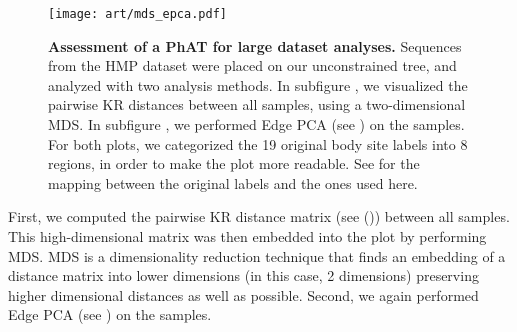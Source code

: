 \begin{figure}[hpbt]
    \centering
    \texttt{[image: art/mds\_epca.pdf]}
    \begin{subfigure}{0pt}
        \label{fig:hmp_mds_epca:sub:mds}
    \end{subfigure}
    \begin{subfigure}{0pt}
        \label{fig:hmp_mds_epca:sub:edge_pca}
    \end{subfigure}
    \caption[Assessment of a \acs{PhAT} for large dataset analyses]{
        \textbf{Assessment of a \acs{PhAT} for large dataset analyses.}
        Sequences from the HMP dataset \citep{Huttenhower2012,Methe2012} were placed
        on our unconstrained  tree, and analyzed with two analysis methods.
        In subfigure , we visualized the pairwise KR distances between all samples,
        using a two-dimensional \acf{MDS}.
        In subfigure , we performed Edge PCA
        (see ) on the samples.
        For both plots, we categorized the 19 original body site labels into 8 regions,
        in order to make the plot more readable.
        See  for the mapping between the original labels and the ones used here.
    }
    \label{fig:hmp_mds_epca}
\end{figure}


First, we computed the pairwise KR distance matrix
(see ()) between all samples.
This high-dimensional matrix was then embedded into the plot by performing \acf{MDS}.
\ac{MDS} \citep{Mardia1978,Krzanowski1994,Everitt2010} is a dimensionality reduction technique that
finds an embedding of a distance matrix into lower dimensions (in this case, \num{2} dimensions)
preserving higher dimensional distances as well as possible.
Second, we again performed Edge PCA \citep{Matsen2011a}
(see ) on the samples.

